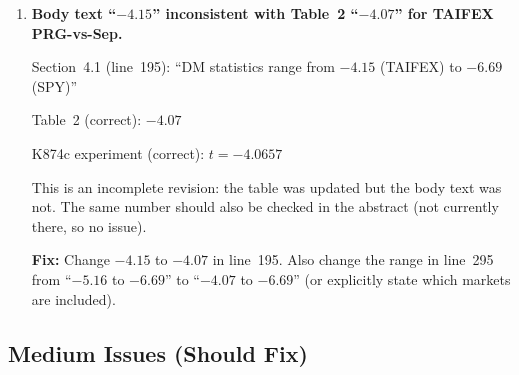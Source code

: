 \documentclass[12pt,a4paper]{article}
\begin{document}
\begin{enumerate}[label=\textbf{S1}]

\item \textbf{Body text ``$-4.15$'' inconsistent with Table~2 ``$-4.07$'' for TAIFEX PRG-vs-Sep.}

Section~4.1 (line~195): ``DM statistics range from $\boldsymbol{-4.15}$ (TAIFEX) to $-6.69$ (SPY)''

Table~2 (correct): $-4.07$

K874c experiment (correct): $t = -4.0657$

This is an incomplete revision: the table was updated but the body text was not. The same number should also be checked in the abstract (not currently there, so no issue).

\textbf{Fix:} Change $-4.15$ to $-4.07$ in line~195. Also change the range in line~295 from ``$-5.16$ to $-6.69$'' to ``$-4.07$ to $-6.69$'' (or explicitly state which markets are included).

\end{enumerate}

\subsection*{\textcolor{warncolor}{Medium Issues (Should Fix)}}
\end{document}
